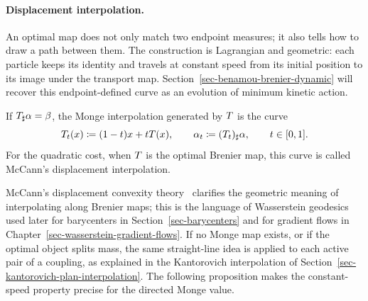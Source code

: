 \paragraph{Displacement interpolation.}
\label{sec-monge-interpolation}

An optimal map does not only match two endpoint measures; it also tells how to draw a path between them. The construction is Lagrangian and geometric: each particle keeps its identity and travels at constant speed from its initial position to its image under the transport map. Section~\ref{sec-benamou-brenier-dynamic} will recover this endpoint-defined curve as an evolution of minimum kinetic action.

\begin{defn}\label{def-monge-mccann-interpolation}
	If $T_\sharp\alpha=\beta$, the Monge interpolation generated by $T$ is the curve
	\[
		T_t(x)\coloneqq(1-t)x+tT(x),
		\qquad
		\alpha_t\coloneqq(T_t)_\sharp\alpha,
		\qquad t\in[0,1].
	\]
	For the quadratic cost, when $T$ is the optimal Brenier map, this curve is called McCann's displacement interpolation.
\end{defn}
McCann's displacement convexity theory~\cite{mccann1997convexity} clarifies the geometric meaning of interpolating along Brenier maps; this is the language of Wasserstein geodesics used later for barycenters in Section~\ref{sec-barycenters} and for gradient flows in Chapter~\ref{sec-wasserstein-gradient-flows}. If no Monge map exists, or if the optimal object splits mass, the same straight-line idea is applied to each active pair of a coupling, as explained in the Kantorovich interpolation of Section~\ref{sec-kantorovich-plan-interpolation}. The following proposition makes the constant-speed property precise for the directed Monge value.

